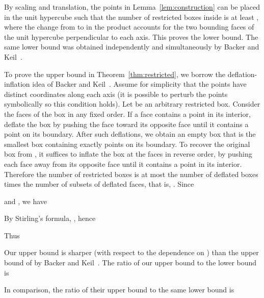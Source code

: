 \documentclass[11pt]{article}
\begin{document}
By scaling and translation, the  points in Lemma~\ref{lem:construction}
can be placed in the unit hypercube  such that
the number of restricted boxes inside  is at least
,
where the change from  to  in the product
accounts for the two bounding faces of the unit hypercube
perpendicular to each axis.
This proves the lower bound. The same lower bound was obtained
independently and simultaneously by Backer and Keil~\cite{Ba09,BK09a,BK09b}.

To prove the upper bound in Theorem~\ref{thm:restricted},
we borrow the deflation-inflation idea of Backer and Keil~\cite{BK09a,BK09b}.
Assume for simplicity that
the points have distinct coordinates along each axis
(it is possible to perturb the points symbolically so this condition holds).
Let  be an arbitrary restricted box.
Consider the  faces of the box in any fixed order.
If a face contains a point in its interior,
deflate the box by pushing the face toward its opposite face
until it contains a point on its boundary.
After  such deflations,
we obtain an empty box  that is the smallest box containing
exactly  points on its boundary.
To recover the original box  from ,
it suffices to inflate the box at the  faces in reverse order,
by pushing each face away from its opposite face until
it contains a point in its interior.
Therefore the number of restricted boxes  is at most
the number of deflated boxes  times the number of subsets of 
deflated faces, that is, .
Since 

and
,
we have

By Stirling's formula, ,
hence 

Thus



Our upper bound is sharper (with respect to the dependence on )
than the upper bound of  by Backer and 
Keil~\cite{BK09a,BK09b}. The ratio of our upper bound to the lower bound is

In comparison, the ratio of their upper bound to the same lower bound is 
\end{document}
